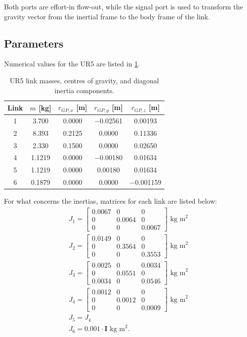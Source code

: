 Both ports are effort-in flow-out, while the signal port is used to transform the gravity vector from the inertial frame to the body frame of the link.

\subsection{Parameters}
Numerical values for the UR5 are listed in \cref{tab:link_params}.
\begin{table}[H]
  \centering
  \caption{UR5 link masses, centres of gravity, and diagonal inertia components.}
  \label{tab:link_params}
  \begin{tabular}{@{}ccccc@{}}
    \toprule
    Link & $m$ [kg] & $r_{GP,x}$ [m] & $r_{GP,y}$ [m] & $r_{GP,z}$ [m] \\
    \midrule
    1 & 3.700  &  0.0000 & $-$0.02561 &  0.00193 \\
    2 & 8.393  &  0.2125 &  0.0000   &  0.11336 \\
    3 & 2.330  &  0.1500 &  0.0000   &  0.02650 \\
    4 & 1.1219 &  0.0000 & $-$0.00180 &  0.01634 \\
    5 & 1.1219 &  0.0000 &  0.00180  &  0.01634 \\
    6 & 0.1879 &  0.0000 &  0.0000   & $-$0.001159 \\
    \bottomrule
  \end{tabular}
\end{table}

For what concerns the inertias, matrices for each link are listed below:
\begin{gather*}
  J_1 = \begin{bmatrix}
    0.0067 & 0 & 0 \\
    0 & 0.0064 & 0 \\
    0 & 0 & 0.0067
  \end{bmatrix} \text{ kg m}^2 \\
  J_2 = \begin{bmatrix}
    0.0149 & 0 & 0 \\
    0 & 0.3564 & 0 \\
    0 & 0 & 0.3553
  \end{bmatrix} \text{ kg m}^2 \\
  J_3 = \begin{bmatrix}
    0.0025 & 0 & 0.0034 \\
    0 & 0.0551 & 0 \\
    0.0034 & 0 & 0.0546
  \end{bmatrix} \text{ kg m}^2 \\
  J_4 = \begin{bmatrix}
    0.0012 & 0 & 0 \\
    0 & 0.0012 & 0 \\
    0 & 0 & 0.0009
   \end{bmatrix} \text{ kg m}^2 \\
   J_5 = J_4 \\
   J_6 = 0.001 \cdot \mathbf{I} \text{ kg m}^2.
\end{gather*}


